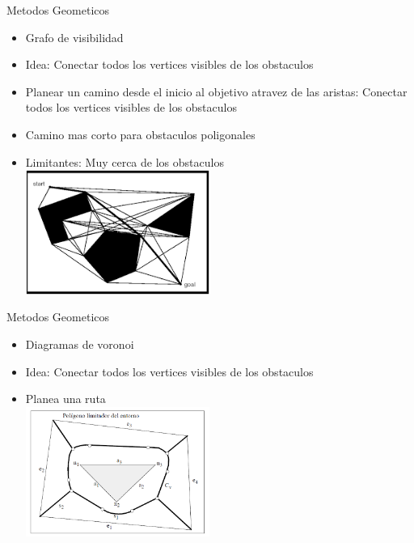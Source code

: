 \documentclass[
	11pt, %
]{beamer}
\begin{document}
\begin{frame}{Metodos Geometicos}
  \begin{itemize}
  \item Grafo de visibilidad\\
  \item Idea: Conectar todos los vertices visibles  de los obstaculos\\
  \item Planear un camino desde el inicio al objetivo atravez de las aristas: Conectar todos los vertices visibles  de los obstaculos\\
  \item Camino mas corto para obstaculos poligonales\\
  \item Limitantes: Muy cerca de los obstaculos\\
    \centering
    \bigskip %
    \includegraphics[width=6cm]{visibilidad}
  \end{itemize}
\end{frame}

\begin{frame}{Metodos Geometicos}
  \begin{itemize}
  \item Diagramas de voronoi\\
  \item Idea: Conectar todos los vertices visibles  de los obstaculos\\
  \item Planea una ruta\\
    \centering
    \bigskip %
    \includegraphics[width=6cm]{voronoi}
  \end{itemize}
\end{frame}
\end{document}
